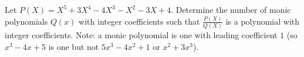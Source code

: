 Let $P\left(X\right)=X^5+3X^4-4X^3-X^2-3X+4$. Determine the number of monic polynomials $Q\left(x\right)$ with integer coefficients such that $\frac{P\left(X\right)}{Q\left(X\right)}$ is a polynomial with integer coefficients. Note: a monic polynomial is one with leading coefficient $1$ (so $x^3-4x+5$ is one but not $5x^3-4x^2+1$ or $x^2+3x^3$).